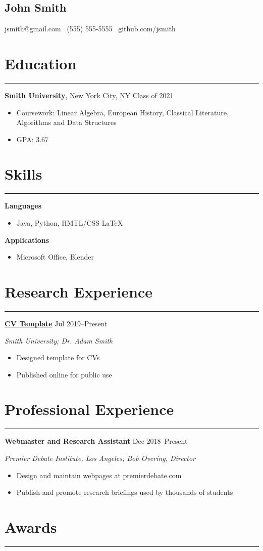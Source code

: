 \documentclass[11pt]{article}
\newcommand{\name}[1]{\begin{center}\section*{\huge \color{highlight} #1}\end{center}}
\newcommand{\topinfo}[1]{\begin{center}\vspace{-0.2cm}#1\vspace{-0.2cm}\end{center}}
\newcommand{\resumesection}[1]{\vspace{-0.3cm}\section*{\color{highlight}#1}\vspace{-0.3cm}\hrule\vspace{0.3cm}}
\begin{document}
\name{John Smith}
\topinfo{jsmith@gmail.com \textbullet\ (555) 555-5555 \textbullet\ github.com/jsmith}

\resumesection{Education}

\textbf{Smith University}, New York City, NY \hfill Class of 2021 \par

\begin{itemize}
	\item Coursework: Linear Algebra, European History, Classical Literature, Algorithms and Data Structures
	\item GPA: 3.67
\end{itemize}


\resumesection{Skills}

\textbf{Languages}
\begin{itemize} 
	\item Java, Python, HMTL/CSS \LaTeX
\end{itemize}\vspace{0.1cm}

\textbf{Applications}
\begin{itemize} 
	\item Microsoft Office, Blender
\end{itemize}

\resumesection{Research Experience}

\textbf{\href{https://github.com/petezh/CV-Template}{CV Template}} \hfill Jul 2019--Present \par
\textit{Smith University; Dr. Adam Smith}
\begin{itemize}
	\item Designed template for CVs
	\item Published online for public use
\end{itemize}\vspace{0.1cm}

\resumesection{Professional Experience}

\textbf{Webmaster and Research Assistant}   \hfill Dec 2018--Present \par
\textit{Premier Debate Institute, Los Angeles; Bob Overing, Director}
\begin{itemize}
	\item Design and maintain webpages at premierdebate.com
	\item Publish and promote research briefings used by thousands of students
\end{itemize}

\resumesection{Awards}
\end{document}
